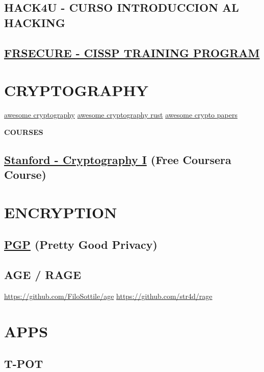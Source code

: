 \documentclass[11pt]{article}
\begin{document}
\subsection{HACK4U - CURSO INTRODUCCION AL HACKING}
\label{sec:org9aecd2d}
\subsection{\href{../../../1_not_ready/study/1_platforms/frsecure/20230411-frsecure_cissp_training_program.org}{FRSECURE - CISSP TRAINING PROGRAM}}
\label{sec:org03c4117}
\section{CRYPTOGRAPHY}
\label{sec:orgb7f9913}
\href{https://github.com/sobolevn/awesome-cryptography}{awesome cryptography}
\href{https://github.com/rust-cc/awesome-cryptography-rust}{awesome cryptography rust}
\href{https://github.com/pFarb/awesome-crypto-papers}{awesome crypto papers}

\textbf{COURSES}
\subsection{\href{https://www.coursera.org/learn/crypto}{Stanford - Cryptography I} (Free Coursera Course)}
\label{sec:org739d2e4}

\section{ENCRYPTION}
\label{sec:org9e18d50}
\subsection{\href{20230427-pgp.org}{PGP} (Pretty Good Privacy)}
\label{sec:org3782142}
\subsection{AGE / RAGE}
\label{sec:org661c6dd}

\url{https://github.com/FiloSottile/age}
\url{https://github.com/str4d/rage}

\section{APPS}
\label{sec:org6bde3e0}
\subsection{T-POT}
\label{sec:orgc4d0a9f}
\end{document}
